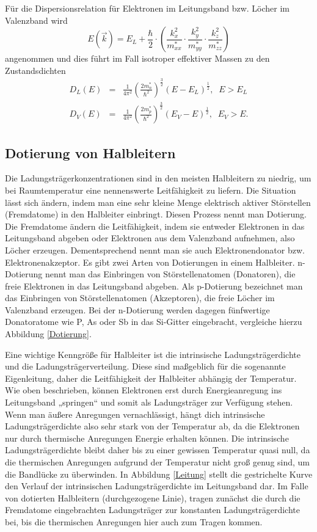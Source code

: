 Für die Dispersionsrelation für Elektronen im Leitungsband bzw. Löcher im Valenzband wird
\begin{equation}
 E(\vec k)= E_L + \frac{\hbar}{2}\cdot \left(\frac{k_x^2}{m^*_{xx}}\cdot \frac{k_y^2}{m^*_{yy}}\cdot\frac{k_z^2}{m^*_{zz}} \right)
\end{equation}
angenommen und dies führt im Fall isotroper effektiver Massen zu den Zustandsdichten
\begin{eqnarray}
 D_L(E)&=&\frac{1}{4\pi^2}\left(\frac{2m_n^*}{\hbar^2}\right)^\frac{3}{2}(E-E_L)^\frac{1}{2},\;\; E>E_L\\
 D_V(E)&=&\frac{1}{4\pi^2}\left(\frac{2m_p^*}{\hbar^2}\right)^\frac{3}{2}(E_V-E)^\frac{1}{2},\;\; E_V>E.
\end{eqnarray}


\subsection{Dotierung von Halbleitern}
Die Ladungsträgerkonzentrationen sind in den meisten Halbleitern zu niedrig, um bei
Raumtemperatur eine nennenswerte Leitfähigkeit zu liefern. Die Situation lässt sich
ändern, indem man eine sehr kleine Menge elektrisch aktiver Störstellen (Fremdatome)
in den Halbleiter einbringt. Diesen Prozess nennt man Dotierung. Die Fremdatome
ändern die Leitfähigkeit, indem sie entweder Elektronen in das Leitungsband abgeben
oder Elektronen aus dem Valenzband aufnehmen, also Löcher erzeugen. Dementsprechend
nennt man sie auch Elektronendonator bzw. Elektronenakzeptor. Es gibt zwei Arten von Dotierungen in einem Halbleiter. n-Dotierung nennt man das
Einbringen von Störstellenatomen (Donatoren), die freie Elektronen in das Leitungsband
abgeben. Als p-Dotierung bezeichnet man das Einbringen von Störstellenatomen
(Akzeptoren), die freie Löcher im Valenzband erzeugen.
Bei der n-Dotierung werden dagegen fünfwertige Donatoratome wie P, As oder Sb in das
Si-Gitter eingebracht, vergleiche hierzu Abbildung \ref{Dotierung}.

Eine wichtige Kenngröße für Halbleiter ist die intrinsische Ladungsträgerdichte und die Ladungsträgerverteilung. Diese sind maßgeblich für die sogenannte Eigenleitung, daher die Leitfähigkeit der Halbleiter abhängig der Temperatur. Wie oben beschrieben, können Elektronen erst durch Energieanregung ins Leitungsband „springen“ und somit als Ladungsträger zur Verfügung stehen. Wenn man äußere Anregungen vernachlässigt, hängt dich intrinsische Ladungsträgerdichte also sehr stark von der Temperatur ab, da die Elektronen nur durch thermische Anregungen Energie erhalten können. Die intrinsische Ladungsträgerdichte bleibt daher bis zu einer gewissen Temperatur quasi null, da die thermischen Anregungen aufgrund der Temperatur nicht groß genug sind, um die Bandlücke zu überwinden.  In Abbildung \ref{Leitung} stellt die gestrichelte Kurve den Verlauf der intrinsischen Ladungsträgerdichte im Leitungsband dar. Im Falle von dotierten Halbleitern (durchgezogene Linie), tragen zunächst die durch die Fremdatome eingebrachten Ladungsträger zur konstanten Ladungsträgerdichte bei, bis die thermischen Anregungen hier auch zum Tragen kommen.

